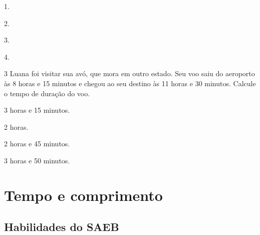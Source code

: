 \begin{escolha}
\begin{multicols}{2}

\item 1.

\item 2.
\end{multicols}


\begin{multicols}{2}

\item 3.

\item 4.
\end{multicols}
\end{escolha}


\num{3} Luana foi visitar sua avó, que mora em outro estado. Seu voo
saiu do aeroporto às 8 horas e 15 minutos e chegou ao seu destino às 11
horas e 30 minutos. Calcule o tempo de duração do voo.

\begin{escolha}
\begin{multicols}{2}

\item 3 horas e 15 minutos.

\item 2 horas.
\end{multicols}


\begin{multicols}{2}

\item 2 horas e 45 minutos.

\item 3 horas e 50 minutos.
\end{multicols}  
\end{escolha}

\chapter{Tempo e comprimento}
\enlargethispage{6\baselineskip}

\vspace*{-1.5cm}

\section*{Habilidades do SAEB}

